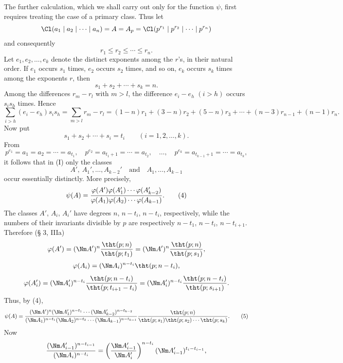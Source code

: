 The further calculation, which we shall carry out only for the function $\psi$, first requires treating the case of a primary class. Thus let
\[
 \Cl(a_1\mid a_2\mid\cdots\mid a_n)=A=A_p=
 \Cl(p^{r_1}\mid p^{r_2}\mid\cdots\mid p^{r_n})
\]
and consequently
\[
 r_1\le r_2\le\cdots\le r_n.
\]
Let $e_1,e_2,\ldots,e_k$ denote the distinct exponents among the $r$'s, in their natural order. If $e_1$ occurs $s_1$ times, $e_2$ occurs $s_2$ times, and so on, $e_k$ occurs $s_k$ times among the exponents $r$, then
\begin{equation}
 s_1+s_2+\cdots+s_k=n.
\tag{1}
\end{equation}
Among the differences $r_m-r_l$ with $m>l$, the difference $e_i-e_h$ $(i>h)$ occurs $s_i s_h$ times. Hence
\begin{equation}
 \sum_{i>h}(e_i-e_h)s_i s_h=\sum_{m>l}r_m-r_l
 =(1-n)r_1+(3-n)r_2+(5-n)r_3+\cdots+(n-3)r_{n-1}+(n-1)r_n.
\tag{2}
\end{equation}
Now put
\[
 s_1+s_2+\cdots+s_i=t_i\qquad (i=1,2,\ldots,k).
\]
From
\begin{equation}
 p^{e_1}=a_1=a_2=\cdots=a_{t_1},\quad
 p^{e_2}=a_{t_1+1}=\cdots=a_{t_2},\quad\ldots,\quad
 p^{e_k}=a_{t_{k-1}+1}=\cdots=a_{t_k},
\tag{3}
\end{equation}
it follows that in (I) only the classes
\[
 A',\ A_1',\ldots,A_{k-2}'
\quad\text{and}\quad
 A_1,\ldots,A_{k-1}
\]
occur essentially distinctly. More precisely,
\begin{equation}
 \psi(A)=
 {\varphi(A')\varphi(A_1')\cdots\varphi(A_{k-2}')
 \over
 \varphi(A_1)\varphi(A_2)\cdots\varphi(A_{k-1})}.
\tag{4}
\end{equation}
The classes $A'$, $A_i$, $A_i'$ have degrees $n$, $n-t_i$, $n-t_i$, respectively, while the numbers of their invariants divisible by $p$ are respectively $n-t_1$, $n-t_i$, $n-t_{i+1}$. Therefore (§ 3, IIIa)
\[
 \varphi(A')=(\Nm A')^n {\tht(p;n)\over\tht(p;t_1)}=(\Nm A')^n {\tht(p;n)\over\tht(p;s_1)},
\]
\[
 \varphi(A_i)=(\Nm A_i)^{n-t_i}\tht(p;n-t_i),
\]
\[
 \varphi(A_i')=(\Nm A_i')^{n-t_i}
 {\tht(p;n-t_i)\over\tht(p;t_{i+1}-t_i)}
 = (\Nm A_i')^{n-t_i}{\tht(p;n-t_i)\over\tht(p;s_{i+1})}.
\]
Thus, by (4),
\begin{equation}
 \psi(A)=
 { (\Nm A')^n(\Nm A_1')^{n-t_1}\cdots(\Nm A_{k-2}')^{n-t_{k-2}}
 \over
 (\Nm A_1)^{n-t_1}(\Nm A_2)^{n-t_2}\cdots(\Nm A_{k-1})^{n-t_{k-1}} }
 {\tht(p;n)\over\tht(p;s_1)\tht(p;s_2)\cdots\tht(p;s_k)}.
\tag{5}
\end{equation}
Now
\[
 { (\Nm A_{i-1}')^{n-t_{i-1}}
 \over (\Nm A_i)^{n-t_i} }
 =\left({\Nm A_{i-1}'\over\Nm A_i'}\right)^{n-t_i}(\Nm A_{i-1}')^{t_i-t_{i-1}},
\]
